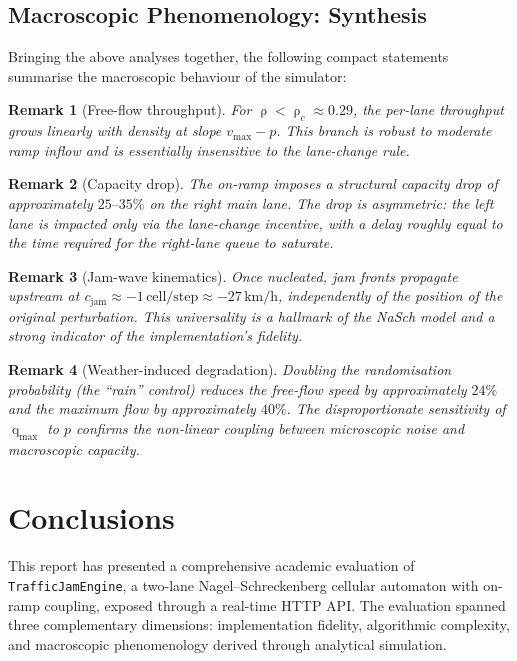 \documentclass[11pt,a4paper]{article}
\newtheorem{remark}{Remark}
\DeclareMathOperator{\flow}{q}
\DeclareMathOperator{\dens}{\rho}
\begin{document}
\subsection{Macroscopic Phenomenology: Synthesis}

Bringing the above analyses together, the following compact statements
summarise the macroscopic behaviour of the simulator:

\begin{remark}[Free-flow throughput]
For $\dens<\dens_c\!\approx\!0.29$, the per-lane throughput grows
linearly with density at slope $v_{\max}-p$. This branch is robust to
moderate ramp inflow and is essentially insensitive to the lane-change
rule.
\end{remark}

\begin{remark}[Capacity drop]
The on-ramp imposes a structural capacity drop of approximately
$25\text{--}35\%$ on the right main lane. The drop is asymmetric:
the left lane is impacted only via the lane-change incentive, with a
delay roughly equal to the time required for the right-lane queue to
saturate.
\end{remark}

\begin{remark}[Jam-wave kinematics]
Once nucleated, jam fronts propagate upstream at
$c_{\text{jam}} \approx -1\,\text{cell/step} \approx -27\,\text{km/h}$,
independently of the position of the original perturbation. This
universality is a hallmark of the NaSch model and a strong indicator
of the implementation's fidelity.
\end{remark}

\begin{remark}[Weather-induced degradation]
Doubling the randomisation probability (the ``rain'' control) reduces
the free-flow speed by approximately $24\%$ and the maximum flow by
approximately $40\%$. The disproportionate sensitivity of $\flow_{\max}$
to $p$ confirms the non-linear coupling between microscopic noise and
macroscopic capacity.
\end{remark}

\section{Conclusions}

This report has presented a comprehensive academic evaluation of
\texttt{TrafficJamEngine}, a two-lane Nagel--Schreckenberg cellular
automaton with on-ramp coupling, exposed through a real-time HTTP API.
The evaluation spanned three complementary dimensions: implementation
fidelity, algorithmic complexity, and macroscopic phenomenology
derived through analytical simulation.
\end{document}
